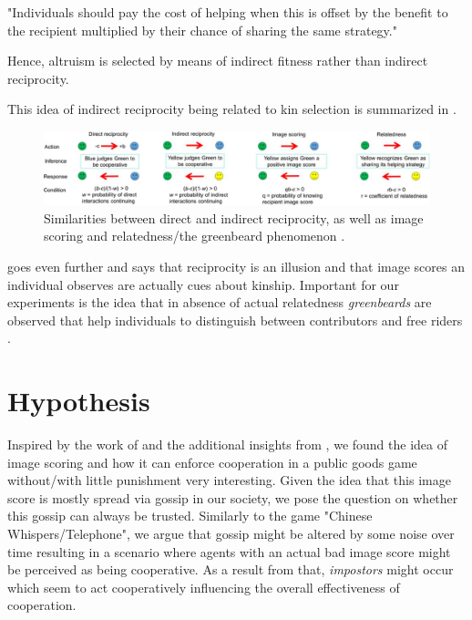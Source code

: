 \documentclass[sigconf]{acmart}
\newcommand{\impostors}{\textit{impostors}\xspace}
\newcommand{\greenbeards}{\textit{greenbeards}\xspace}
\begin{document}
    "Individuals should pay the cost of helping when this is offset by the benefit to the recipient multiplied by their chance of sharing the same strategy." \cite{roberts_kin_2019}

    Hence, altruism is selected by means of indirect fitness rather than indirect reciprocity.

    This idea of indirect reciprocity being related to kin selection is summarized in .

    \begin{figure}
        \includegraphics[width=\textwidth]{figures/indirect_reciprocity}
        \caption{Similarities between direct and indirect reciprocity, as well as image scoring and relatedness/the greenbeard phenomenon \cite{roberts_kin_2019}.}
        \label{fig:indirect_reciprocity}
    \end{figure}

    \citeauthor{roberts_kin_2019} goes even further and says that reciprocity is an illusion and that image scores an individual observes are actually cues about kinship.
    Important for our experiments is the idea that in absence of actual relatedness \greenbeards are observed that help individuals to distinguish between contributors and free riders \cite{roberts_kin_2019}.


    \section{Hypothesis}\label{sec:hypothesis}
    Inspired by the work of \citeauthor{milinski_cooperation_2002} \cite{milinski_cooperation_2002} and the additional insights from \citeauthor{roberts_kin_2019} \cite{roberts_kin_2019}, we found the idea of image scoring and how it can enforce cooperation in a public goods game without/with little punishment very interesting.
    Given the idea that this image score is mostly spread via gossip in our society, we pose the question on whether this gossip can always be trusted.
    Similarly to the game "Chinese Whispers/Telephone", we argue that gossip might be altered by some noise over time resulting in a scenario where agents with an actual bad image score might be perceived as being cooperative.
    As a result from that, \impostors might occur which seem to act cooperatively influencing the overall effectiveness of cooperation.
\end{document}
